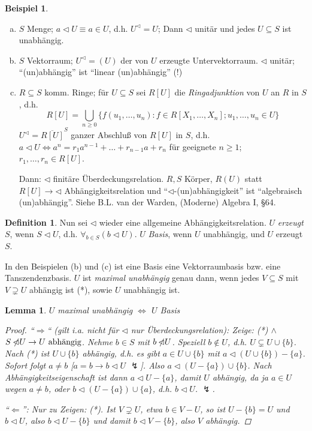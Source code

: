 \documentclass[headsepline=true,DIV=11]{scrartcl}
\newtheorem*{lemma}{Lemma}
\theoremstyle{definition}
\newtheorem*{definition}{Definition}
\newtheorem*{example}{Beispiel}
\renewcommand{\bar}[1]{\overline{#1}}
\newcommand{\nlhd}{\not\!\!\lhd} %
\begin{document}
\begin{example}
	\begin{enumerate}[(a)]
		\item $S$ Menge; $a\lhd U \equiv a\in U$, d.h. $U^\lhd=U$; Dann $\lhd$ unitär und jedes $U\subseteq S$ ist unabhängig.
		\item $S$ Vektorraum; $U^\lhd=(U)$ der von $U$ erzeugte Untervektorraum. $\lhd$ unitär; ``(un)abhängig'' ist ``linear (un)abhängig'' (!)
		\item $R\subseteq S$ komm. Ringe; für $U\subseteq S$ sei $R[U]$ die {\em Ringadjunktion} von $U$ an $R$ in $S$, d.h.
			\[ R[U]= \bigcup_{n\ge 0} \{ f(u_1,\ldots,u_n)\colon f\in R[X_1,\ldots,X_n]; u_1,\ldots, u_n \in U\} \]
			$U^\lhd = \bar{ R[U] }^S$ ganzer Abschluß von $R[U]$ in $S$, d.h. $a\lhd U\iff a^n = r_1a^{n-1}+\ldots+r_{n-1} a + r_n$ für geeignete $n\ge 1$; $r_1,\ldots,r_n\in R[U]$.
			
			Dann: $\lhd$ finitäre Überdeckungsrelation.
			$R, S$ Körper, $R(U)$ statt $R[U]\to \lhd$ Abhängigkeitsrelation und ``$\lhd$-(un)abhängigkeit'' ist ``algebraisch (un)abhängig''.
			Siehe B.L. van der Warden, (Moderne) Algebra I, §64.
	\end{enumerate}
\end{example}

\begin{definition}
	Nun sei $\lhd$ wieder eine allgemeine Abhängigkeitsrelation.
	$U$ {\em erzeugt} $S$, wenn $S\lhd U$, d.h. $\forall_{b\in S}(b\lhd U)$.
	$U$ {\em Basis}, wenn $U$ unabhängig, und $U$ erzeugt $S$.
	
	In den Beispielen (b) und (c) ist eine Basis eine Vektorraumbasis bzw. eine Tanszendenzbasis.
	$U$ ist {\em maximal unabhängig} genau dann, wenn jedes $V\subseteq S$ mit $V\supsetneq U$ abhängig ist (*), sowie $U$ unabhängig ist.
\end{definition}

\begin{lemma}
	$U$ maximal unabhängig $\iff$ $U$ Basis
	\begin{proof}
		``$\Rightarrow$`` (gilt i.a. nicht für $\lhd$ nur Überdeckungsrelation):
		Zeige: (*) $\land$ $S\nlhd U \to U \text{ abhängig}$.
		Nehme $b\in S$ mit $b\nlhd U$.
		Speziell $b\notin U$, d.h. $U\subsetneq U\cup \{b\}$.
		Nach (*) ist $U\cup \{b\}$ abhängig, d.h. es gibt $a\in U\cup \{b\}$ mit $a\lhd (U\cup \{b\})-\{a\}$.
		Sofort folgt $a\neq b$ [$a=b\to b\lhd U$ $\lightning$].
		Also $a\lhd (U-\{a\})\cup\{b\}$.
		Nach Abhängigkeitseigenschaft ist dann $a\lhd U-\{a\}$, damit $U$ abhängig, da ja $a\in U$ wegen $a\neq b$, 
		oder $b\lhd (U-\{a\})\cup\{a\}$, d.h. $b\lhd U$. $\lightning$.

		``$\Leftarrow$'': Nur zu Zeigen: (*).
		Ist $V\supsetneq U$, etwa $b\in V-U$, so ist $U-\{b\}=U$ und $b\lhd U$, also $b\lhd U-\{b\}$ und damit $b\lhd V-\{b\}$, also $V$ abhängig.
	\end{proof}
\end{lemma}
\end{document}
